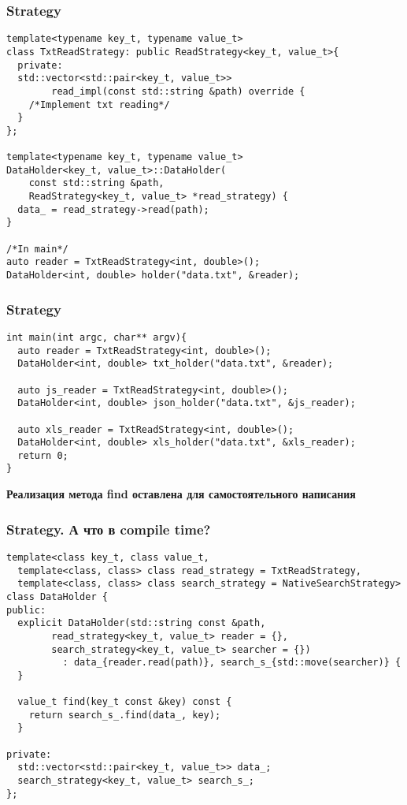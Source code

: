\begin{frame}[fragile]
  \frametitle{Strategy}
  \begin{verbatim}
template<typename key_t, typename value_t>
class TxtReadStrategy: public ReadStrategy<key_t, value_t>{
  private:
  std::vector<std::pair<key_t, value_t>> 
        read_impl(const std::string &path) override {
    /*Implement txt reading*/
  }
};

template<typename key_t, typename value_t>
DataHolder<key_t, value_t>::DataHolder(
    const std::string &path, 
    ReadStrategy<key_t, value_t> *read_strategy) {
  data_ = read_strategy->read(path);
}

/*In main*/
auto reader = TxtReadStrategy<int, double>();
DataHolder<int, double> holder("data.txt", &reader);
  \end{verbatim}  
\end{frame}

\begin{frame}[fragile]
  \frametitle{Strategy}
  \begin{verbatim}
int main(int argc, char** argv){
  auto reader = TxtReadStrategy<int, double>();
  DataHolder<int, double> txt_holder("data.txt", &reader);
  
  auto js_reader = TxtReadStrategy<int, double>();
  DataHolder<int, double> json_holder("data.txt", &js_reader);
  
  auto xls_reader = TxtReadStrategy<int, double>();
  DataHolder<int, double> xls_holder("data.txt", &xls_reader);
  return 0;
}
  \end{verbatim} 

\bf{Реализация метода find оставлена для самостоятельного написания}
\end{frame}
\begin{frame}[fragile]
  \frametitle{Strategy. А что в compile time?}
  \begin{verbatim}
template<class key_t, class value_t,
  template<class, class> class read_strategy = TxtReadStrategy,
  template<class, class> class search_strategy = NativeSearchStrategy>
class DataHolder {
public:
  explicit DataHolder(std::string const &path,
        read_strategy<key_t, value_t> reader = {},
        search_strategy<key_t, value_t> searcher = {}) 
          : data_{reader.read(path)}, search_s_{std::move(searcher)} {
  }
  
  value_t find(key_t const &key) const {
    return search_s_.find(data_, key);
  }
  
private:
  std::vector<std::pair<key_t, value_t>> data_;
  search_strategy<key_t, value_t> search_s_;
};
  \end{verbatim}  
\end{frame}

